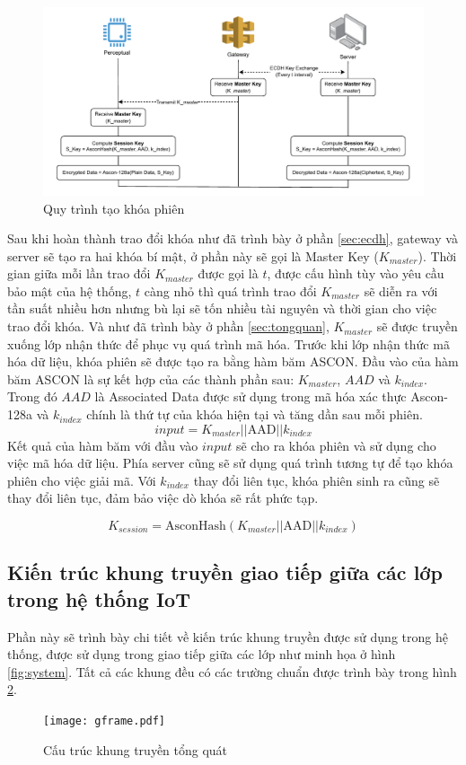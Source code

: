\begin{figure}[h]
    \centering
    \hspace*{-1cm}
    \includegraphics[width=1.1\linewidth]{skey.pdf}
    \caption{Quy trình tạo khóa phiên}
    \label{fig:skey}
\end{figure}

Sau khi hoàn thành trao đổi khóa như đã trình bày ở phần \ref{sec:ecdh}, gateway và server sẽ tạo ra hai khóa bí mật, ở phần này sẽ gọi là Master Key ($K_{master}$). Thời gian giữa mỗi lần trao đổi $K_{master}$ được gọi là $t$, được cấu hình tùy vào yêu cầu bảo mật của hệ thống, $t$ càng nhỏ thì quá trình trao đổi $K_{master}$ sẽ diễn ra với tần suất nhiều hơn nhưng bù lại sẽ tốn nhiều tài nguyên và thời gian cho việc trao đổi khóa. Và như đã trình bày ở phần \ref{sec:tongquan}, $K_{master}$ sẽ được truyền xuống lớp nhận thức để phục vụ quá trình mã hóa.  Trước khi lớp nhận thức mã hóa dữ liệu, khóa phiên sẽ được tạo ra bằng hàm băm ASCON. Đầu vào của hàm băm ASCON là sự kết hợp của các thành phần sau: $K_{master}$, $AAD$ và $k_{index}$. Trong đó $AAD$ là Associated Data được sử dụng trong mã hóa xác thực Ascon-128a và $k_{index}$ chính là thứ tự của khóa hiện tại và tăng dần sau mỗi phiên. 
\[
input = K_{master} || \text{AAD} ||k_{index}
\]
Kết quả của hàm băm với đầu vào $input$ sẽ cho ra khóa phiên và sử dụng cho việc mã hóa dữ liệu. Phía server cũng sẽ sử dụng quá trình tương tự để tạo khóa phiên cho việc giải mã. Với $k_{index}$ thay đổi liên tục, khóa phiên sinh ra cũng sẽ thay đổi liên tục, đảm bảo việc dò khóa sẽ rất phức tạp. 

\[
    K_{session} = \text{AsconHash}(K_{master} || \text{AAD} ||k_{index})
\]

\subsection{Kiến trúc khung truyền giao tiếp giữa các lớp trong hệ thống IoT}
\label{sec:frame}
Phần này sẽ trình bày chi tiết về kiến trúc khung truyền được sử dụng trong hệ thống, được sử dụng trong giao tiếp giữa các lớp như minh họa ở hình \ref{fig:system}. Tất cả các khung đều có các trường chuẩn được trình
bày trong hình \ref{fig:gframe}.
\begin{figure}[H]
    \centering
    \texttt{[image: gframe.pdf]}
    \caption{Cấu trúc khung truyền tổng quát}
    \label{fig:gframe}
\end{figure}

